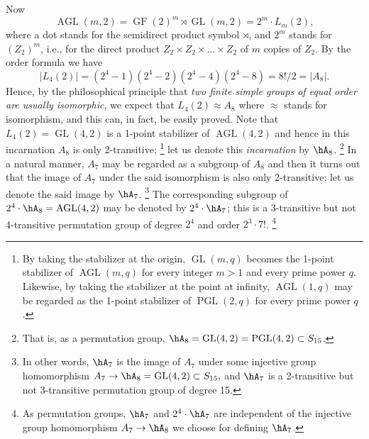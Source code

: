 Now
$$
\operatorname{AGL}(m,2)=\operatorname{GF}(2)^m \rtimes 
\operatorname{GL}(m,2)
=2^m \cdot L_m(2),
$$
where a  dot stands for the semidirect
product symbol $\rtimes$, and $2^m$ stands for $(Z_2)^m	$, 
i.e., for the direct
product $Z_2 \times Z_2 \times \dots \times Z_2$ of $m$ 
copies of
$Z_2$.  By the order formula we have 
$$
|L_4(2)|=(2^4-1)(2^4-2)(2^4-4)(2^4-8)=8!/2=|A_8|.
$$
Hence, by the philosophical principle that {\it two finite 
simple groups
of equal order are usually isomorphic}, we expect that 
$L_4(2) \approx
A_8$ where $\approx$ stands for isomorphism, and this can, 
in fact, be
easily proved.  Note that $L_4(2)=\operatorname{GL}(4,2)$ 
is a 1-point stabilizer of
$\operatorname{AGL}(4,2)$ and hence in this incarnation 
$A_8$ is only 2-transitive;
\footnote{By taking the stabilizer at the origin, 
$\operatorname{GL}(m,q)$ becomes the
1-point stabilizer of $\operatorname{AGL}(m,q)$ for every 
integer $m>1$ and every
prime power $q$. Likewise, by taking the stabilizer at the 
point at 
infinity, $\operatorname{AGL}(1,q)$ may be regarded as the 
1-point stabilizer of
$\operatorname{PGL}(2,q)$ for every prime power $q$.} 
let us denote this {\it incarnation} by $\hA_8$. 
\footnote{That is, as a permutation group, 
$\hA_8=\operatorname{GL}(4,2)=\operatorname{PGL}(4,2)%
\subset S_{15}$.} 
In a natural manner, $A_7$ may
be regarded as a subgroup of $A_8$ and then it turns out 
that the image of
$A_7$ under the said isomorphism is also only 
2-transitive; let us denote 
the said image by $\hA_7$.  
\footnote{In other words, $\hA_7$ is the image of $A_7$ 
under some injective
group homomorphism 
$A_7\to\hA_8=\operatorname{GL}(4,2)\subset S_{15},$ 
and $\hA_7$ is a 2-transitive
but not 3-transitive permutation group of degree 15.}
The corresponding subgroup of 
$2^4 \cdot \hA_8 = \operatorname{AGL}(4,2)$ may be denoted 
by $2^4 \cdot \hA_7$; 
this is a 3-transitive but not 4-transitive permutation 
group of degree
$2^4$ and order $2^3\cdot 7!$.
\footnote{As  permutation groups, $\hA_7$ and $2^4\cdot 
\hA_7$ 
are independent of the
injective group homomorphism $A_7\to\hA_8$ we choose for 
defining $\hA_7$.}


